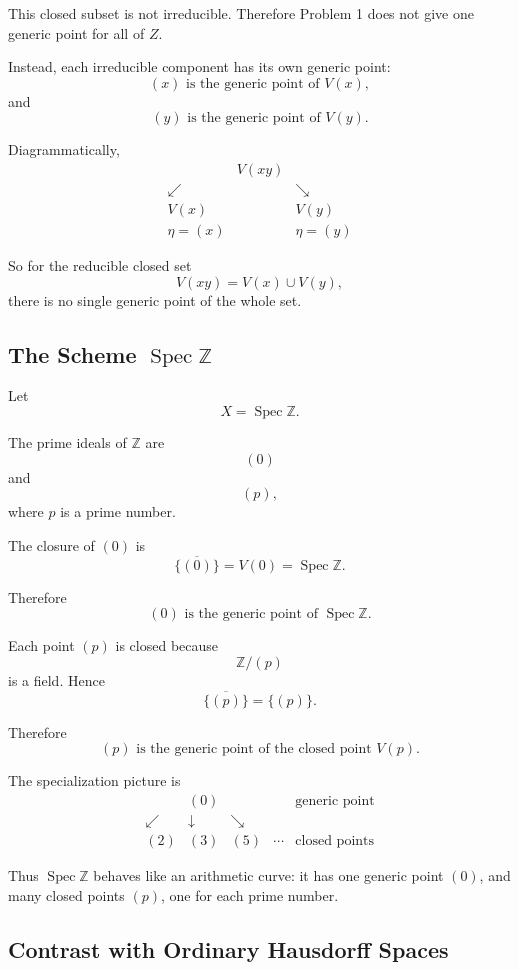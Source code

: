\documentclass[12pt,a4paper]{article}
\theoremstyle{notespace}
\begin{document}
This closed subset is not irreducible. Therefore Problem 1 does not give one generic point for all of \(Z\).

Instead, each irreducible component has its own generic point:
\[
\boxed{(x)\text{ is the generic point of }V(x),}
\]
and
\[
\boxed{(y)\text{ is the generic point of }V(y).}
\]

Diagrammatically,
\[
\begin{array}{ccc}
	& V(xy) &
	\\[0.6em]
	\swarrow & & \searrow
	\\[0.6em]
	V(x) & & V(y)
	\\[0.4em]
	\eta=(x) & & \eta=(y)
\end{array}
\]

So for the reducible closed set
\[
V(xy)=V(x)\cup V(y),
\]
there is no single generic point of the whole set.

\subsection{The Scheme \(\operatorname{Spec}\mathbb Z\)}

Let
\[
X=\operatorname{Spec}\mathbb Z.
\]

The prime ideals of \(\mathbb Z\) are
\[
(0)
\]
and
\[
(p),
\]
where \(p\) is a prime number.

The closure of \((0)\) is
\[
\overline{\{(0)\}}=V(0)=\operatorname{Spec}\mathbb Z.
\]

Therefore
\[
\boxed{(0)\text{ is the generic point of }\operatorname{Spec}\mathbb Z.}
\]

Each point \((p)\) is closed because
\[
\mathbb Z/(p)
\]
is a field. Hence
\[
\overline{\{(p)\}}=\{(p)\}.
\]

Therefore
\[
\boxed{(p)\text{ is the generic point of the closed point }V(p).}
\]

The specialization picture is
\[
\begin{array}{ccccc}
	& (0) & & & \text{generic point}
	\\[0.6em]
	\swarrow & \downarrow & \searrow
	\\[0.6em]
	(2) & (3) & (5) & \cdots & \text{closed points}
\end{array}
\]

Thus \(\operatorname{Spec}\mathbb Z\) behaves like an arithmetic curve: it has one generic point \((0)\), and many closed points \((p)\), one for each prime number.

\subsection{Contrast with Ordinary Hausdorff Spaces}
\end{document}
